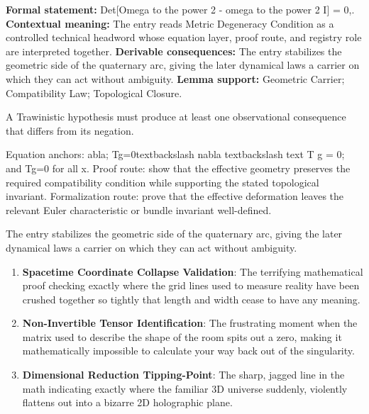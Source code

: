 \begingroup\footnotesize\setlength{\emergencystretch}{3em}\sloppy
\textbf{Formal statement:} Det[Omega to the power 2 - omega to the power 2 I] = 0,. \textbf{Contextual meaning:} The entry reads Metric Degeneracy Condition as a controlled technical headword whose equation layer, proof route, and registry role are interpreted together. \textbf{Derivable consequences:} The entry stabilizes the geometric side of the quaternary arc, giving the later dynamical laws a carrier on which they can act without ambiguity. \textbf{Lemma support:} Geometric Carrier; Compatibility Law; Topological Closure.\par
\endgroup

A Trawinistic hypothesis must produce at least one observational consequence that differs from its negation.

Equation anchors: abla; Tg=0textbackslash nabla textbackslash text T g = 0; and Tg=0 for all x. Proof route: show that the effective geometry preserves the required compatibility condition while supporting the stated topological invariant. Formalization route: prove that the effective deformation leaves the relevant Euler characteristic or bundle invariant well-defined.

The entry stabilizes the geometric side of the quaternary arc, giving the later dynamical laws a carrier on which they can act without ambiguity.
\endgroup

\begin{enumerate}[leftmargin=1.6em,itemsep=6pt,topsep=4pt]
\item \textbf{Spacetime Coordinate Collapse Validation}: The terrifying mathematical proof checking exactly where the grid lines used to measure reality have been crushed together so tightly that length and width cease to have any meaning.
\item \textbf{Non-Invertible Tensor Identification}: The frustrating moment when the matrix used to describe the shape of the room spits out a zero, making it mathematically impossible to calculate your way back out of the singularity.
\item \textbf{Dimensional Reduction Tipping-Point}: The sharp, jagged line in the math indicating exactly where the familiar 3D universe suddenly, violently flattens out into a bizarre 2D holographic plane.
\end{enumerate}

